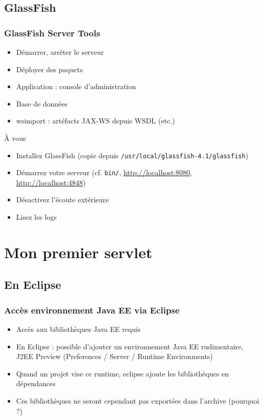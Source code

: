 \documentclass[english, french]{beamer}
\begin{document}
\subsection{GlassFish}
\begin{frame}
	\frametitle{GlassFish Server Tools}
	\begin{itemize}
		\item Démarrer, arrêter le serveur
		\item Déployer des paquets
		\item Application : console d’administration
		\item Base de données
		\item wsimport : artéfacts JAX-WS depuis WSDL (etc.)
	\end{itemize}
	\begin{block}{À vous}
		\begin{itemize}
			\item \og{}Installez\fg{} GlassFish (copie depuis \texttt{/usr/local/glassfish-4.1/glassfish})
			\item Démarrez votre serveur (cf. \texttt{bin/}, \url{http://localhost:8080}, \url{http://localhost:4848})
			\item Désactivez l’écoute extérieure
			\item Lisez les logs
		\end{itemize}
	\end{block}
\end{frame}

\section[Un servlet]{Mon premier servlet}
\subsection{En Eclipse}
\begin{frame}
	\frametitle{Accès environnement Java EE via Eclipse}
	\begin{itemize}
		\item Accès aux bibliothèques Java EE requis
		\item En Eclipse : possible d’ajouter un environnement Java EE rudimentaire, \og{}J2EE Preview\fg{} (Preferences / Server / Runtime Environments)
		\item Quand un projet vise ce runtime, eclipse ajoute les bibliothèques en dépendances
		\item Ces bibliothèques ne seront cependant pas exportées dans l’archive (pourquoi ?)
	\end{itemize}
\end{frame}
\end{document}
